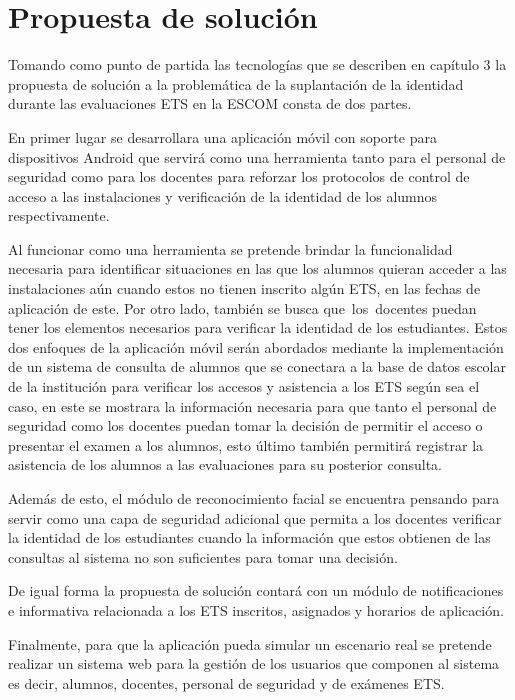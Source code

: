 

\section{Propuesta de solución}

Tomando como punto de partida las tecnologías que se describen en capítulo 3 la propuesta de solución a la problemática de la suplantación de la identidad durante las  evaluaciones ETS en la ESCOM consta de dos partes. 

En primer lugar se desarrollara una aplicación móvil con soporte para dispositivos Android que servirá como una herramienta tanto para el personal de seguridad como para los docentes para reforzar los protocolos de control de acceso a las instalaciones y verificación de la identidad de los alumnos respectivamente. 

Al funcionar como una herramienta se pretende brindar la funcionalidad necesaria para identificar situaciones en las que los alumnos quieran acceder a las instalaciones aún cuando estos no tienen inscrito algún ETS, en las fechas de aplicación de este.
Por otro lado, también se busca que los docentes puedan tener los elementos necesarios para verificar la identidad de los estudiantes.
Estos dos enfoques de la aplicación móvil serán abordados mediante la implementación de un sistema de consulta de alumnos que se conectara a la base de datos escolar de la institución para verificar los accesos y asistencia a los ETS según sea el caso, en este se mostrara la información necesaria para que tanto el personal de seguridad como los docentes puedan tomar la decisión de permitir el acceso o presentar el examen a los alumnos, esto último también permitirá registrar la asistencia de los alumnos a las evaluaciones para su posterior consulta.

Además de esto, el módulo de reconocimiento facial se encuentra pensando para servir como una capa de seguridad adicional que permita a los docentes verificar la identidad de los estudiantes cuando la información que estos obtienen de las consultas al sistema no son suficientes para tomar una decisión.

De igual forma la propuesta de solución contará con un módulo de notificaciones e informativa relacionada a los ETS inscritos, asignados y horarios de aplicación.

Finalmente, para que la aplicación pueda simular un escenario real se pretende realizar un sistema web para la gestión de los usuarios que componen al sistema es decir, alumnos, docentes, personal de seguridad y de exámenes ETS.






